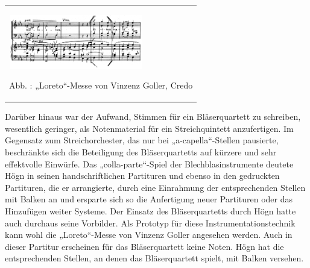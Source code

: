 \documentclass[a4paper]{article}
\newcounter{Abb}
\renewcommand\theAbb{\arabic{Abb}}
\begin{document}
\begin{flushleft}
\tablefirsthead{}
\tablehead{}
\tabletail{}
\tablelasttail{}
\begin{supertabular}{m{6.019cm}}

\begin{center}

\includegraphics[width=5.837cm,height=2.35cm]{pictures/zulassungsarbeit-img075.png}

\end{center}
Abb. \stepcounter{Abb}{\theAbb}: „Loreto“-Messe von Vinzenz Goller,
Credo\\
\end{supertabular}
\end{flushleft}
Darüber hinaus war der Aufwand, Stimmen für ein Bläserquartett zu
schreiben, wesentlich geringer, als Notenmaterial für ein
Streichquintett anzufertigen. Im Gegensatz zum Streichorchester, das
nur bei „a-capella“-Stellen pausierte, beschränkte sich die Beteiligung
des Bläserquartetts auf kürzere und sehr effektvolle Einwürfe. Das
„colla-parte“-Spiel der Blechblasinstrumente deutete Högn in seinen
handschriftlichen Partituren und ebenso in den gedruckten Partituren,
die er arrangierte, durch eine Einrahmung der entsprechenden Stellen
mit Balken an und ersparte sich so die Anfertigung neuer Partituren
oder das Hinzufügen weiter Systeme. Der Einsatz des Bläserquartetts
durch Högn hatte auch durchaus seine Vorbilder. Als Prototyp für diese
Instrumentationstechnik kann wohl die „Loreto“-Messe von Vinzenz Goller
angesehen werden. Auch in dieser Partitur erscheinen für das
Bläserquartett keine Noten. Högn hat die entsprechenden Stellen, an
denen das Bläserquartett spielt, mit Balken versehen.
\end{document}
